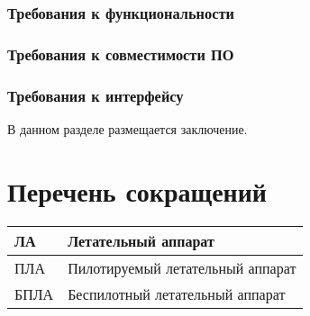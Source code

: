\documentclass{itmo-student-thesis}
\begin{document}
\subsection{Требования к функциональности}

\subsection{Требования к совместимости ПО}

\subsection{Требования к интерфейсу}

\startconclusionpage

В данном разделе размещается заключение.

\printmainbibliography
\nocite{*}

\appendix

\chapter{Перечень сокращений}\label{sec:app:1}

\begin{table}[!h]
  \centering
  \begin{tabularx}{\textwidth}{|L{0.5} L{1.5}|}
    \hline
    ЛА & Летательный аппарат \\ \hline
    ПЛА & Пилотируемый летательный аппарат \\ \hline
    БПЛА & Беспилотный летательный аппарат \\ \hline
  \end{tabularx}
\end{table}
\end{document}
